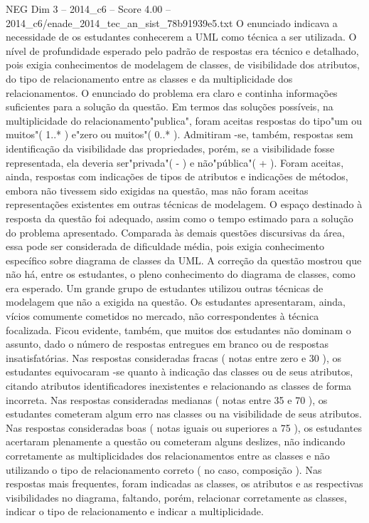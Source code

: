 \begin{textsample}{NEG Dim 3 – 2014\_c6 – Score 4.00 – 2014\_c6/enade\_2014\_tec\_an\_sist\_78b91939e5.txt}
O enunciado indicava a necessidade de os estudantes conhecerem a UML como técnica a ser utilizada.
O nível de profundidade esperado pelo padrão de respostas era técnico e detalhado, pois exigia conhecimentos de modelagem de classes, de visibilidade dos atributos, do tipo de relacionamento entre as classes e da multiplicidade dos relacionamentos.
O enunciado do problema era claro e continha informações suficientes para a solução da questão.
Em termos das soluções possíveis, na multiplicidade do relacionamento"publica", foram aceitas respostas do tipo"um ou muitos"( 1..* ) e"zero ou muitos"( 0..* ).
Admitiram -se, também, respostas sem identificação da visibilidade das propriedades, porém, se a visibilidade fosse representada, ela deveria ser"privada"( - ) e não"pública"( + ).
Foram aceitas, ainda, respostas com indicações de tipos de atributos e indicações de métodos, embora não tivessem sido exigidas na questão, mas não foram aceitas representações existentes em outras técnicas de modelagem.
O espaço destinado à resposta da questão foi adequado, assim como o tempo estimado para a solução do problema apresentado.
Comparada às demais questões discursivas da área, essa pode ser considerada de dificuldade média, pois exigia conhecimento específico sobre diagrama de classes da UML.
A correção da questão mostrou que não há, entre os estudantes, o pleno conhecimento do diagrama de classes, como era esperado.
Um grande grupo de estudantes utilizou outras técnicas de modelagem que não a exigida na questão.
Os estudantes apresentaram, ainda, vícios comumente cometidos no mercado, não correspondentes à técnica focalizada.
Ficou evidente, também, que muitos dos estudantes não dominam o assunto, dado o número de respostas entregues em branco ou de respostas insatisfatórias.
Nas respostas consideradas fracas ( notas entre zero e 30 ), os estudantes equivocaram -se quanto à indicação das classes ou de seus atributos, citando atributos identificadores inexistentes e relacionando as classes de forma incorreta.
Nas respostas consideradas medianas ( notas entre 35 e 70 ), os estudantes cometeram algum erro nas classes ou na visibilidade de seus atributos.
Nas respostas consideradas boas ( notas iguais ou superiores a 75 ), os estudantes acertaram plenamente a questão ou cometeram alguns deslizes, não indicando corretamente as multiplicidades dos relacionamentos entre as classes e não utilizando o tipo de relacionamento correto ( no caso, composição ).
Nas respostas mais frequentes, foram indicadas as classes, os atributos e as respectivas visibilidades no diagrama, faltando, porém, relacionar corretamente as classes, indicar o tipo de relacionamento e indicar a multiplicidade.

\end{textsample}
